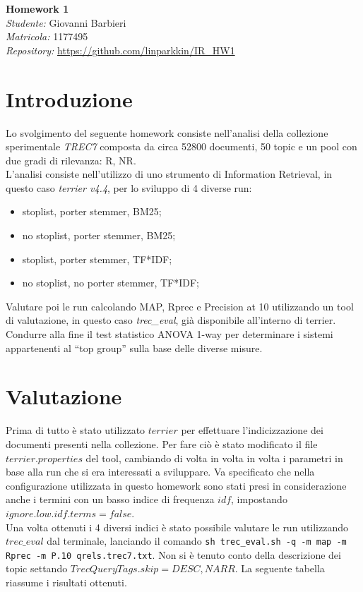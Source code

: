 \documentclass[a4paper, 11pt]{article}
\begin{document}
\noindent
\large\textbf{Homework 1} \\
\normalsize \textit{Studente:} Giovanni Barbieri\\
\textit{Matricola:} 1177495\\
\textit{Repository:} \url{https://github.com/linparkkin/IR_HW1}


\section*{Introduzione}
Lo svolgimento del seguente homework consiste nell'analisi della collezione sperimentale \textit{TREC7} composta da circa 52800 documenti, 50 topic e un pool con due gradi di rilevanza: R, NR. \\
L'analisi consiste nell'utilizzo di uno strumento di Information Retrieval, in questo caso \textit{terrier v4.4}, per lo sviluppo di 4 diverse run: 
\begin{itemize}
 \item stoplist, porter stemmer, BM25;
 \item no stoplist, porter stemmer, BM25;
 \item stoplist, porter stemmer, TF*IDF;
 \item no stoplist, no porter stemmer, TF*IDF;
\end{itemize}
Valutare poi le run calcolando MAP, Rprec e Precision at 10 utilizzando un tool di valutazione, in questo caso \textit{trec\_eval}, già disponibile all'interno di terrier. \\
Condurre alla fine il test statistico  ANOVA 1-way per determinare i sistemi appartenenti al ``top group'' sulla base delle diverse misure. 

\section*{Valutazione}

Prima di tutto è stato utilizzato $terrier$ per effettuare l'indicizzazione dei documenti presenti nella collezione. Per fare ciò è stato modificato il file $terrier.properties$ del tool, cambiando di volta in volta in volta i parametri in base alla run che si era interessati a sviluppare. Va specificato che nella configurazione utilizzata in questo homework sono stati presi in considerazione anche i termini con un basso indice di frequenza $idf$, impostando $ignore.low.idf.terms=false$. \\
Una volta ottenuti i 4 diversi indici è stato possibile valutare le run utilizzando $trec\_eval$ dal terminale, lanciando il comando \texttt{sh trec\_eval.sh -q -m map -m Rprec -m P.10 qrels.trec7.txt}. Non si è tenuto conto della descrizione dei topic settando $TrecQueryTags.skip=DESC,NARR$.
La seguente tabella riassume i risultati ottenuti.
\end{document}
